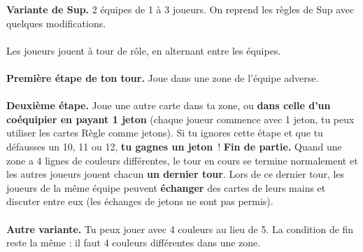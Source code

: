 \documentclass[a4paper]{memoir}
\begin{document}
{\footnotesize

\noindent
\textbf{ Variante de Sup.} 2 équipes de 1 à 3 joueurs. On reprend les règles de Sup avec quelques modifications.
\\
\\
\noindent
{} Les joueurs jouent à tour de rôle, en alternant entre les équipes.
\\
\\
\noindent
\textbf{ Première étape de ton tour.} Joue dans une zone de l’équipe adverse.
\\
\\
\noindent
\textbf{ Deuxième étape.} Joue une autre carte dans ta zone,
ou \textbf{dans celle d’un coéquipier en payant 1 jeton} (chaque joueur commence avec 1 jeton, tu peux utiliser les cartes Règle comme jetons).
Si tu ignores cette étape et que tu défausses un 10, 11 ou 12, \textbf{tu gagnes un jeton} !
\newpage
\noindent
\textbf{ Fin de partie.} Quand une zone a 4 lignes de couleurs différentes, le tour en cours se termine normalement et les autres joueurs jouent chacun \textbf{un dernier tour}. 
Lors de ce dernier tour, les joueurs de la même équipe peuvent \textbf{échanger} des cartes de leurs mains et discuter entre eux (les échanges de jetons ne sont pas permis).
\noindent
\\
\\
\noindent
\textbf{ Autre variante.} Tu peux jouer avec 4 couleurs au lieu de 5. La condition de fin reste la même : il faut 4 couleurs différentes dans une zone.
}
\end{document}
